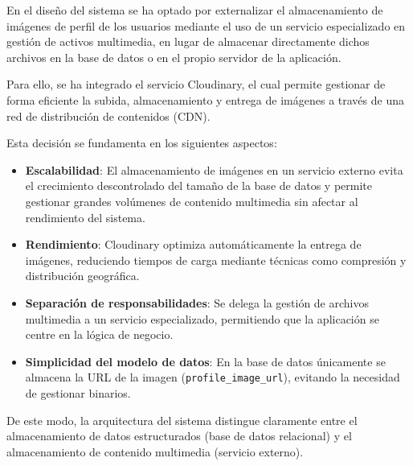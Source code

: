 En el diseño del sistema se ha optado por externalizar el almacenamiento de imágenes de perfil de los usuarios mediante el uso de un servicio especializado en gestión de activos multimedia, en lugar de almacenar directamente dichos archivos en la base de datos o en el propio servidor de la aplicación.

Para ello, se ha integrado el servicio Cloudinary, el cual permite gestionar de forma eficiente la subida, almacenamiento y entrega de imágenes a través de una red de distribución de contenidos (CDN).

Esta decisión se fundamenta en los siguientes aspectos:

\begin{itemize}
    \item \textbf{Escalabilidad}: El almacenamiento de imágenes en un servicio externo evita el crecimiento descontrolado del tamaño de la base de datos y permite gestionar grandes volúmenes de contenido multimedia sin afectar al rendimiento del sistema.

    \item \textbf{Rendimiento}: Cloudinary optimiza automáticamente la entrega de imágenes, reduciendo tiempos de carga mediante técnicas como compresión y distribución geográfica.

    \item \textbf{Separación de responsabilidades}: Se delega la gestión de archivos multimedia a un servicio especializado, permitiendo que la aplicación se centre en la lógica de negocio.

    \item \textbf{Simplicidad del modelo de datos}: En la base de datos únicamente se almacena la URL de la imagen (\texttt{profile\_image\_url}), evitando la necesidad de gestionar binarios.
\end{itemize}

De este modo, la arquitectura del sistema distingue claramente entre el almacenamiento de datos estructurados (base de datos relacional) y el almacenamiento de contenido multimedia (servicio externo).